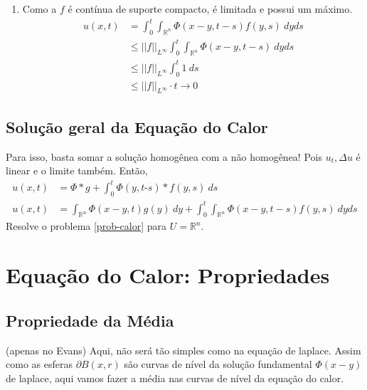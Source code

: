 \documentclass[11pt]{article}
\newcommand{\Rn}{{\mathbb{R}^n}}
\newcommand{\p}{\partial}
\newcommand{\norm}[2]{\left|\left|#1\right|\right|_{L^{#2}}}
\begin{document}
\begin{enumerate}
	\item Como a \(f\) é contínua de suporte compacto, é limitada e possui um máximo.\begin{align*}
		u(x,t)&=\int_0^t \int_\Rn \Phi(x-y,t-s) f(y,s)\ dy ds \\
		&\leq \norm{f}{\infty} \int_0^t \int_\Rn \Phi(x-y,t-s)\ dy ds \\
		&\leq \norm{f}{\infty} \int_0^t 1\ ds \\
		&\leq \norm{f}{\infty}\cdot t \rightarrow 0 
	\end{align*}
\end{enumerate}


\subsection*{Solução geral da Equação do Calor}
Para isso, basta somar a solução homogênea com a não homogênea! Pois \(u_t, \Delta u\) é linear e o limite também. Então, \begin{align*}
	u(x,t) &= \Phi * g + \int_0^t \Phi(y,t\text{-}s) * f(y,s)\ ds \\
	u(x,t) &= \int_\Rn \Phi(x-y,t)g(y)\ dy + \int_0^t \int_\Rn \Phi(x-y,t-s)f(y,s)\ dyds 
\end{align*}
Resolve o problema \ref{prob-calor} para \(U=\Rn\).

























\section{Equação do Calor: Propriedades}


\subsection{Propriedade da Média}

(apenas no Evans) Aqui, não será tão simples como na equação de laplace. Assim como as esferas \(\p B(x,r)\) são curvas de nível da solução fundamental \(\Phi(x-y)\) de laplace, aqui vamos fazer a média nas curvas de nível da equação do calor.
\end{document}
